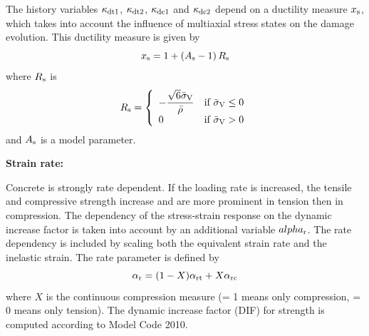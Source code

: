 \documentclass[a4paper]{article}
\begin{document}
The history variables $\kappa_{\rm dt1}$, $\kappa_{\rm dt2}$, $\kappa_{\rm dc1}$ and $\kappa_{\rm dc2}$ depend on a ductility measure $x_{\rm s}$, which takes into account the influence of multiaxial stress states on the damage evolution.
This ductility measure is given by
\begin{equation}
x_{\rm s} = 1+ \left(A_{\rm s}-1\right) R_{\rm s}
\end{equation}
where $R_{\rm s}$ is
\begin{equation}
R_{\rm s} = \left \{ \begin{array}{ll} -\dfrac{\sqrt{6} \bar{\sigma}_{\rm V}}{\bar{\rho}} & \mbox{if $\bar{\sigma}_{\rm V} \leq 0$} \\
    0 & \mbox{if $\bar{\sigma}_{\rm V} > 0$}  \end{array} \right.
\end{equation}
and $A_{\rm s}$ is a model parameter.
 
\noindent\textbf{Strain rate:}

Concrete is strongly rate dependent. If the loading rate is increased, the tensile and compressive strength increase and are more prominent in tension then in compression. The dependency of the stress-strain response on the dynamic increase factor is taken into account by an additional variable $alpha_{\rm r}$. The rate dependency is included by scaling both the equivalent strain rate and the inelastic strain. The rate parameter is defined by
\begin{equation}
\alpha_{\rm r}=(1-X) \alpha_{\rm rt} + X  \alpha_{\rm rc}
\end{equation}
where $X$ is the continuous compression measure (= 1 means only compression, = 0 means only tension).
The dynamic increase factor (DIF) for strength is computed according to Model Code 2010.  
\end{document}
